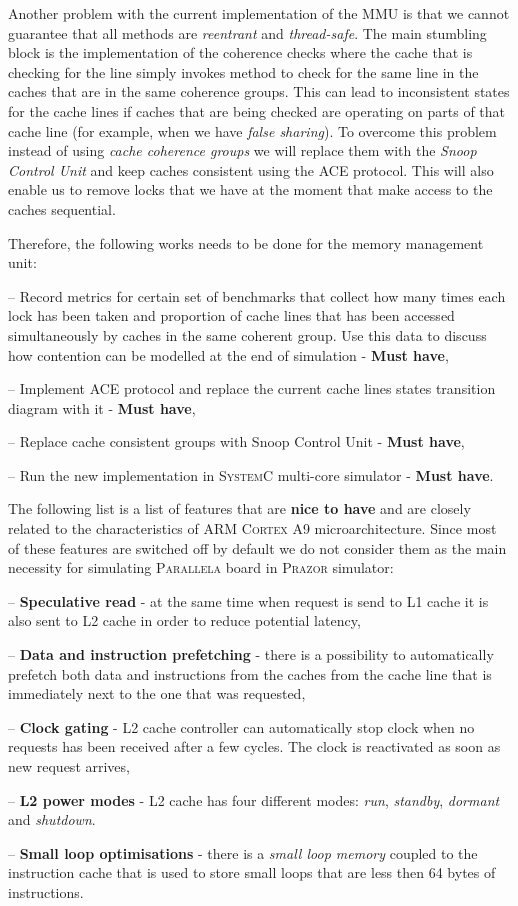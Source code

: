 \documentclass{hitec}
\let\oldmarginpar\marginpar
\renewcommand\marginpar[1]{\-\oldmarginpar[\raggedleft #1]%
{\raggedright #1}}
\newenvironment{checklist}{%
  \begin{list}{}{}%
  \let\olditem\item
  \renewcommand\item{\olditem -- \marginpar{$\Box$} }
  \newcommand\checkeditem{\olditem -- \marginpar{$\CheckedBox$} }
}{%
  \end{list}
}
\begin{document}
Another problem with the current implementation of the MMU is that we cannot
guarantee that all methods are \textit{reentrant} and \textit{thread-safe}. The
main stumbling block is the implementation of the coherence checks where the
cache that is checking for the line simply invokes method to check for the same
line in the caches that are in the same coherence groups. This can lead to
inconsistent states for the cache lines if caches that are being checked are
operating on parts of that cache line (for example, when we have \textit{false
  sharing}). To overcome this problem instead of using \textit{cache coherence
  groups} we will replace them with the \textit{Snoop Control Unit} and keep
caches consistent using the \textsc{ACE} protocol. This will also enable us to
remove locks that we have at the moment that make access to the caches
sequential. 

Therefore, the following works needs to be done for the memory management unit:
\begin{checklist}
\item Record metrics for certain set of benchmarks that collect how many times
  each lock has been taken and proportion of cache lines that has been accessed
  simultaneously by caches in the same coherent group. Use this data to discuss
  how contention can be modelled at the end of simulation - \textbf{Must have},
\item Implement \textsc{ACE} protocol and replace the current cache lines states
  transition diagram with it - \textbf{Must have},
\item Replace cache consistent groups with Snoop Control Unit - \textbf{Must
  have},
\item Run the new implementation in \textsc{SystemC} multi-core simulator -
  \textbf{Must have}. 
\end{checklist}

The following list is a list of features that are \textbf{nice to have} and are closely
related to the characteristics of \textsc{ARM Cortex A9}
microarchitecture. Since most of these features are switched off by default we
do not consider them as the main necessity for simulating \textsc{Parallela}
board in \textsc{Prazor} simulator:
\begin{checklist}
\checkeditem \textbf{Speculative read} - at the same time when request is send
to L1 cache it is also sent to L2 cache in order to reduce potential latency,
\checkeditem \textbf{Data and instruction prefetching} - there is a possibility
to automatically prefetch both data and instructions from the caches from the
cache line that is immediately next to the one that was requested,
\checkeditem \textbf{Clock gating} - L2 cache controller can automatically stop
clock when no requests has been received after a few cycles. The clock is
reactivated as soon as new request arrives,
\checkeditem \textbf{L2 power modes} - L2 cache has four different modes:
\textit{run}, \textit{standby}, \textit{dormant} and \textit{shutdown}. 
\checkeditem \textbf{Small loop optimisations} - there is a \textit{small loop
  memory} coupled to the instruction cache that is used to store small loops
that are less then 64 bytes of instructions. 
\end{checklist}
\end{document}
